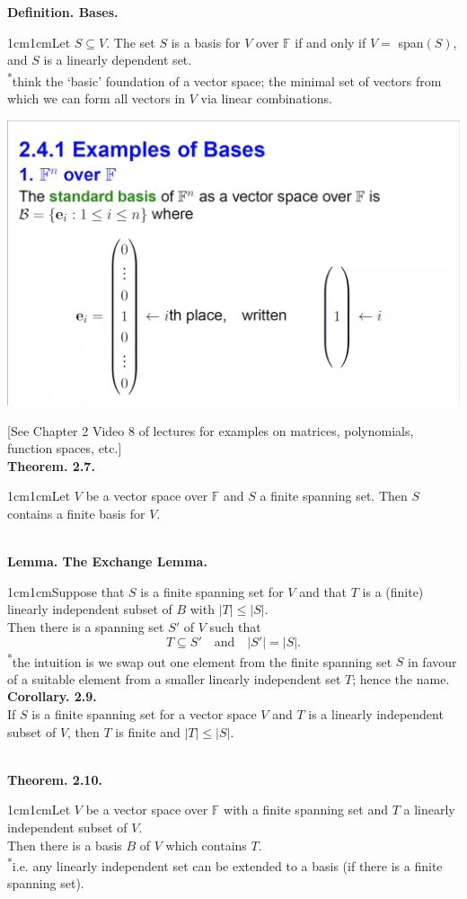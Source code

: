 \documentclass{article}
\newcommand{\definition}[2]{\textbf{Definition. #1.}\begin{adjustwidth}{1cm}{1cm}#2\end{adjustwidth}}
\newcommand{\theorem}[2]{\textbf{Theorem. #1.}\begin{adjustwidth}{1cm}{1cm}#2\end{adjustwidth}}
\newcommand{\lemma}[2]{\textbf{Lemma. #1.}\begin{adjustwidth}{1cm}{1cm}#2\end{adjustwidth}}
\begin{document}
\definition{Bases}{Let $S \subseteq V$. The set $S$ is a basis for $V$ over $\mathbb{F}$ if and only if $V =$ span$(S)$, and $S$ is a linearly dependent set.\\[1\baselineskip]\textsuperscript{*}think the `basic' foundation of a vector space; the minimal set of vectors from which we can form all vectors in $V$ via linear combinations.}
\begin{center}
  \includegraphics[scale=0.18]{assets/basis_eg.png}
\end{center}
[See Chapter 2 Video 8 of lectures for examples on matrices, polynomials, function spaces, etc.]\\[1\baselineskip]
\theorem{2.7}{Let $V$ be a vector space over $\mathbb{F}$ and $S$ a finite spanning set. Then $S$ contains a finite basis for $V$.}~\\
\lemma{The Exchange Lemma}{Suppose that $S$ is a finite spanning set for $V$ and that $T$ is a (finite) linearly independent subset of $B$ with $|T| \leq |S|$.\\Then there is a spanning set $S'$ of $V$ such that \[T \subseteq S' \quad \text{and} \quad |S'| = |S|.\]\textsuperscript{*}the intuition is we swap out one element from the finite spanning set $S$ in favour of a suitable element from a smaller linearly independent set $T$; hence the name.\\[1\baselineskip]
\textbf{Corollary. 2.9.}\\If $S$ is a finite spanning set for a vector space $V$ and $T$ is a linearly independent subset of $V$, then $T$ is finite and $|T| \leq |S|$.}~\\
\theorem{2.10}{Let $V$ be a vector space over $\mathbb{F}$ with a finite spanning set and $T$ a linearly independent subset of $V$.\\Then there is a basis $B$ of $V$ which contains $T$.\\ \textsuperscript{*}i.e. any linearly independent set can be extended to a basis (if there is a finite spanning set).}~\\ 
\end{document}
